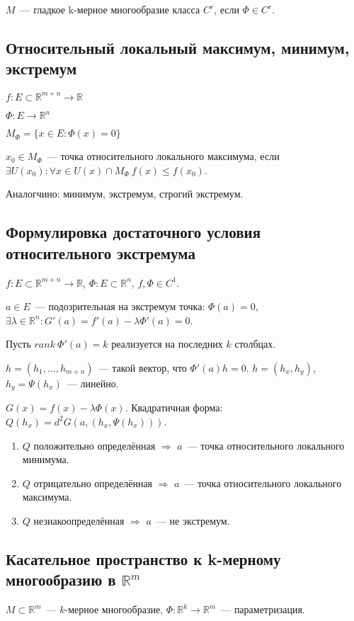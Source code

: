 \documentclass[paper=a4, fontsize=11pt]{article}
\begin{document}
$M$~--- гладкое k-мерное многообразие класса $C^r$, если $\Phi \in C^r$.

\subsection{Относительный локальный максимум, минимум, экстремум}
$f: E \subset \mathds{R}^{m+n} \rightarrow \mathds{R}$

$\Phi: E \rightarrow \mathds{R}^n$

$M_\Phi = \{ x \in E: \Phi(x) = 0 \}$

$x_0 \in M_\Phi$~--- точка относительного локального максимума, если $\exists U(x_0): \forall x \in U(x) \cap M_\Phi\ f(x) \leq f(x_0)$.

Аналогчино: минимум, экстремум, строгий экстремум.

\subsection{Формулировка достаточного условия относительного экстремума}
$f: E \subset \mathds{R}^{m+n} \rightarrow \mathds{R}$, $\Phi: E \subset \mathds{R}^n$, $f, \Phi \in C^1$.

$a \in E$~--- подозрительная на экстремум точка: $\Phi(a) = 0$, $\exists \lambda \in \mathds{R}^n: G'(a) = f'(a) - \lambda\Phi'(a) = 0$.

Пусть $rank\ \Phi'(a)=k$ реализуется на последних $k$ столбцах.

$h = (h_1,\dots,h_{m+n})$~--- такой вектор, что $\Phi'(a)h = 0$. $h = (h_x,h_y)$, $h_y = \Psi(h_x)$~--- линейно.

$G(x) = f(x) - \lambda\Phi(x)$. Квадратичная форма: $Q(h_x) = d^2G(a,(h_x,\Psi(h_x)))$.
\begin{enumerate}
    \item $Q$ положительно определённая $\Rightarrow$ $a$~--- точка относительного локального минимума.
    \item $Q$ отрицательно определённая $\Rightarrow$ $a$~--- точка относительного локального максимума.
    \item $Q$ незнакоопределённая $\Rightarrow$ $a$~--- не экстремум.
\end{enumerate}
\subsection{Касательное пространство к k-мерному многообразию в $\mathds{R}^m$}
$M \subset \mathds{R}^m$~--- $k$-мерное многообразие, $\Phi: \mathds{R}^k \rightarrow \mathds{R}^m$~--- параметризация.
\end{document}
